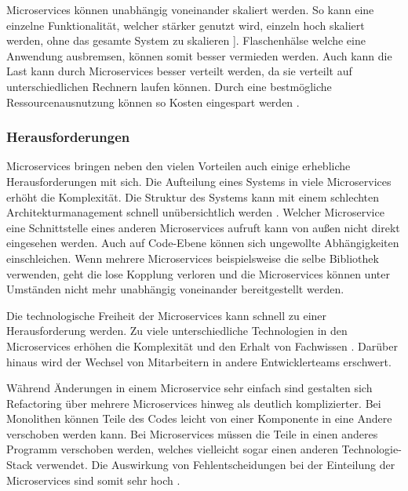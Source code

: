 Microservices können unabhängig voneinander skaliert werden. So kann eine einzelne Funktionalität, welcher stärker genutzt wird, einzeln hoch skaliert werden, ohne das gesamte System zu skalieren \parencite[vgl.][S. 5]{wolffMicroservices2018}]. Flaschenhälse welche eine Anwendung ausbremsen, können somit besser vermieden werden. Auch kann die Last kann durch Microservices besser verteilt werden, da sie verteilt auf unterschiedlichen Rechnern laufen können. Durch eine bestmögliche Ressourcenausnutzung können so Kosten eingespart werden \parencite[vgl.][S. 27]{newmanMicroservices2015}.

\subsubsection{Herausforderungen}

Microservices bringen neben den vielen Vorteilen auch einige erhebliche Herausforderungen mit sich. Die Aufteilung eines Systems in viele Microservices erhöht die Komplexität. Die Struktur des Systems kann mit einem schlechten Architekturmanagement schnell unübersichtlich werden \parencite[vgl.][S. 77]{wolffMicroservices2018}. Welcher Microservice eine Schnittstelle eines anderen Microservices aufruft kann von außen nicht direkt eingesehen werden. Auch auf Code-Ebene können sich ungewollte Abhängigkeiten einschleichen. Wenn mehrere Microservices beispielsweise die selbe Bibliothek verwenden, geht die lose Kopplung verloren und die Microservices können unter Umständen nicht mehr unabhängig voneinander bereitgestellt werden.

Die technologische Freiheit der Microservices kann schnell zu einer Herausforderung werden. Zu viele unterschiedliche Technologien in den Microservices erhöhen die Komplexität und den Erhalt von Fachwissen \parencite[vgl.][S.65]{trempArchitekturen2021}. Darüber hinaus wird der Wechsel von Mitarbeitern in andere Entwicklerteams erschwert.

Während Änderungen in einem Microservice sehr einfach sind gestalten sich Refactoring über mehrere Microservices hinweg als deutlich komplizierter. Bei Monolithen können Teile des Codes leicht von einer Komponente in eine Andere verschoben werden kann. Bei Microservices müssen die Teile in einen anderes  Programm verschoben werden, welches vielleicht sogar einen anderen Technologie-Stack verwendet. Die Auswirkung von Fehlentscheidungen bei der Einteilung der Microservices sind somit sehr hoch \parencite[vgl.][S. 6]{wolffMicroservices2018}.

